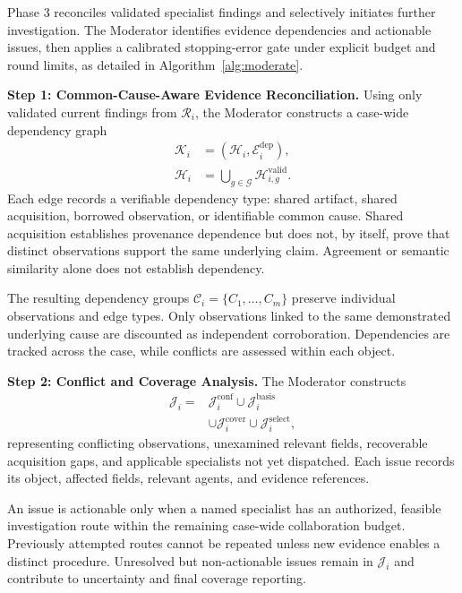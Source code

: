 Phase 3 reconciles validated specialist
findings and selectively initiates further
investigation. The Moderator identifies
evidence dependencies and actionable issues,
then applies a calibrated stopping-error
gate under explicit budget and round limits,
as detailed in Algorithm~\ref{alg:moderate}.

\medskip
\noindent\textbf{Step 1: Common-Cause-Aware
Evidence Reconciliation.}
Using only validated current findings
from $\mathcal R_i$, the Moderator
constructs a case-wide dependency graph
\begin{equation}
\begin{aligned}
\mathcal K_i
&=(\mathcal H_i,\mathcal E_i^{\mathrm{dep}}),\\
\mathcal H_i
&=\bigcup_{g\in\mathcal G}
\mathcal H_{i,g}^{\mathrm{valid}}.
\end{aligned}
\label{eq:evidence-dependency-graph}
\end{equation}
Each edge records a verifiable dependency
type: shared artifact, shared acquisition,
borrowed observation, or identifiable
common cause. Shared acquisition establishes
provenance dependence but does not, by
itself, prove that distinct observations
support the same underlying claim.
Agreement or semantic similarity alone
does not establish dependency.

The resulting dependency groups
$\mathcal C_i=\{C_1,\ldots,C_m\}$
preserve individual observations and
edge types. Only observations linked
to the same demonstrated underlying
cause are discounted as independent
corroboration. Dependencies are tracked
across the case, while conflicts are
assessed within each object.

\medskip
\noindent\textbf{Step 2: Conflict and
Coverage Analysis.}
The Moderator constructs
\begin{equation}
\begin{aligned}
\mathcal J_i={}&
\mathcal J_i^{\mathrm{conf}}
\cup\mathcal J_i^{\mathrm{basis}}\\
&\cup\mathcal J_i^{\mathrm{cover}}
\cup\mathcal J_i^{\mathrm{select}},
\end{aligned}
\label{eq:moderator-issues}
\end{equation}
representing conflicting observations,
unexamined relevant fields, recoverable
acquisition gaps, and applicable
specialists not yet dispatched.
Each issue records its object, affected
fields, relevant agents, and evidence
references.

An issue is actionable only when a
named specialist has an authorized,
feasible investigation route within
the remaining case-wide collaboration
budget. Previously attempted routes
cannot be repeated unless new evidence
enables a distinct procedure. Unresolved
but non-actionable issues remain in
$\mathcal J_i$ and contribute to
uncertainty and final coverage reporting.


